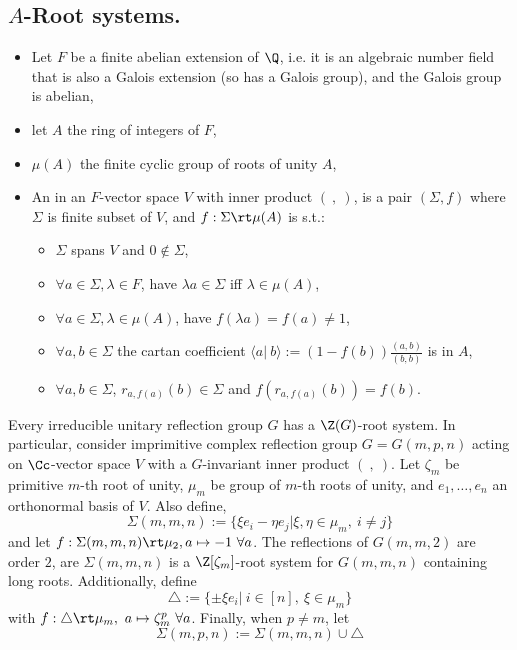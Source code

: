 \subsection{\texorpdfstring{$A$}{A}-Root systems.}\label{a_root_sys_sec}

\begin{definition}\begin{itemize}
  \item Let $F$ be a finite abelian extension of $\Q$, i.e. it is an algebraic number field that is also a Galois extension (so has a Galois group), and the Galois group is abelian,
  
  \item let $A$ the ring of integers of $F$,
  
  \item $\mu(A)$ the finite cyclic group of roots of unity $A$,
  
  \item An  in an $F$-vector space $V$ with inner product $(\ ,\ )$, is a pair $(\Sigma,f)$ where $\Sigma$ is finite subset of $V$, and $f:\Sigma\rt \mu(A)$ is s.t.:
  \begin{itemize}
    \item $\Sigma$ spans $V$ and $0\notin \Sigma$,
    \item $\forall a\in \Sigma,\lambda\in F$, have $\lambda a\in \Sigma$ iff $\lambda\in \mu(A)$,
    \item $\forall a\in \Sigma, \lambda\in \mu(A)$, have $f(\lambda a)=f(a)\neq 1$,
    \item $\forall a,b\in \Sigma$ the cartan coefficient $\langle a|\ b\rangle :=(1-f(b))\frac{(a,b)}{(b,b)}$ is in $A$,
    \item $\forall a,b\in \Sigma$, $r_{a,f(a)}(b)\in \Sigma$ and $f(r_{a,f(a)}(b))=f(b)$.
  \end{itemize}
\end{itemize}
\end{definition}

\nt Every irreducible unitary reflection group $G$ has a $\Z(G)$-root system. In particular, consider imprimitive complex reflection group $G=G(m,p,n)$ acting on $\Cc$-vector space $V$ with a $G$-invariant inner product $(\ ,\ )$. Let $\zeta_m$ be primitive $m$-th root of unity, $\mu_m$ be group of $m$-th roots of unity, and $e_1,\dots,e_n$ an orthonormal basis of $V$. Also define,
$$\Sigma(m,m,n):=\{\xi e_i-\eta e_j| \xi,\eta\in \mu_m,\ i\neq j\}$$
and let $f:\Sigma(m,m,n)\rt \mu_2, a\mapsto -1\ \forall a$. 
The reflections of $G(m,m,2)$ are order $2$, are $\Sigma(m,m,n)$ is a $\Z[\zeta_m]$-root system for $G(m,m,n)$ containing long roots.  Additionally, define
$$\triangle:=\{\pm \xi e_i|\ i\in [n],\ \xi\in \mu_m\}$$
with $f:\triangle \rt \mu_m,\ a\mapsto \zeta_m^p\ \forall a$. Finally, when $p\neq m$, let 
$$\Sigma(m,p,n):=\Sigma(m,m,n)\cup \triangle$$

